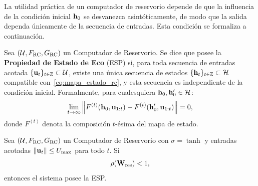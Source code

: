 La utilidad práctica de un computador de reservorio depende de que la
influencia de la condición inicial $\mathbf{h}_0$ se desvanezca
asintóticamente, de modo que la salida dependa únicamente de la
secuencia de entradas.  Esta condición se formaliza a continuación.

\begin{definition}
\label{def:esp}
Sea $(\mathcal{U}, F_{\text{RC}}, G_{\text{RC}})$ un Computador de
Reservorio.  Se dice que posee la \textbf{Propiedad de Estado de Eco}
(ESP) si, para toda secuencia de entradas acotada
$\{\mathbf{u}_t\}_{t \in \mathbb{Z}} \subset \mathcal{U}$, existe una
única secuencia de estados $\{\mathbf{h}_t\}_{t \in \mathbb{Z}}
\subset \mathcal{H}$ compatible con~\eqref{eq:mapa_estado_rc}, y esta
secuencia es independiente de la condición inicial.  Formalmente,
para cualesquiera $\mathbf{h}_0, \mathbf{h}_0' \in \mathcal{H}$:
\begin{equation}
    \lim_{t \to \infty} \left\|
    F^{(t)}(\mathbf{h}_0, \mathbf{u}_{1:t}) -
    F^{(t)}(\mathbf{h}_0', \mathbf{u}_{1:t})
    \right\| = 0,
    \label{eq:esp_formal}
\end{equation}
donde $F^{(t)}$ denota la composición $t$-ésima del mapa de estado.
\end{definition}

\begin{theorem}
\label{teo:esp_suficiente}
Sea $(\mathcal{U}, F_{\text{RC}}, G_{\text{RC}})$ un Computador de
Reservorio con $\sigma = \tanh$ y entradas acotadas
$\|\mathbf{u}_t\| \le U_{\max}$ para todo $t$.  Si
\begin{equation}
    \rho(\mathbf{W}_{\text{res}}) < 1,
    \label{eq:condicion_esp}
\end{equation}
entonces el sistema posee la ESP.
\end{theorem}

